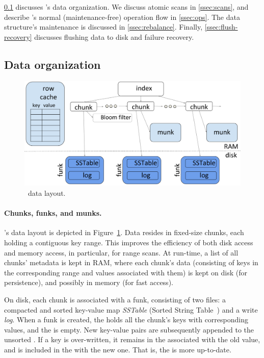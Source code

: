
\cref{ssec:layout}  discusses \sys's data organization. 
We discuss
atomic scans  in \cref{ssec:scans}, and describe \sys's
 normal (maintenance-free) operation flow  in \cref{ssec:ops}.  
The data structure's maintenance is discussed in \cref{ssec:rebalance}.
Finally, \cref{ssec:flush-recovery} discusses flushing data to disk and failure recovery.


\subsection{Data organization}
\label{ssec:layout}

\begin{figure}[tb]
\centerline{
\includegraphics[width=\columnwidth]{PiWi.png}
}
\caption{\sys\ data layout.}
\label{fig:layout}
\end{figure}

\paragraph{Chunks, funks, and munks.}

\sys's data layout is depicted in Figure~\ref{fig:layout}.
Data resides in fixed-size chunks, each holding a contiguous key range.
This improves the efficiency of both disk access and memory access, in particular, for  range scans. 
At run-time, a list of all chunks' metadata is kept in RAM, where each chunk's data 
(consisting of keys in the corresponding range and values associated with them) 
is kept on disk (for persistence), and possibly in memory (for fast access). 

On disk, each chunk is associated with a funk, %
consisting of two files:  a compacted and sorted  key-value map \emph{SSTable} (Sorted String Table~\cite{Bigtable2008}) 
and a write \emph{log}. When a funk is created, the  holds all the chunk's keys with corresponding values, and the   is empty.
New key-value pairs are subsequently appended to the unsorted . If a key is over-written, it remains in the  associated with the old value, and is included in the  with the new one.
That is, the  is more up-to-date.

